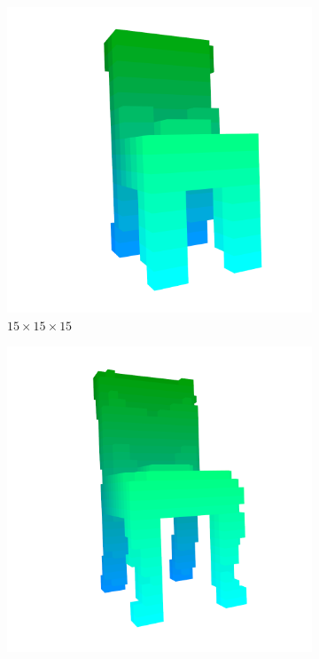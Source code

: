\begin{figure}[!t]
	\centering
	\begin{subfigure}{0.32\linewidth}
		\includegraphics[width=\linewidth]{Figures/ObjRecog/chair_voxel_15}
		\caption{$15\times15\times15$}
		\label{subfig:objrecog:binary_voxel_grids:15}
	\end{subfigure}
	\hfill
	\begin{subfigure}{0.32\linewidth}
		\includegraphics[width=\linewidth]{Figures/ObjRecog/chair_voxel_30}

\end{subfigure}
\end{figure}
